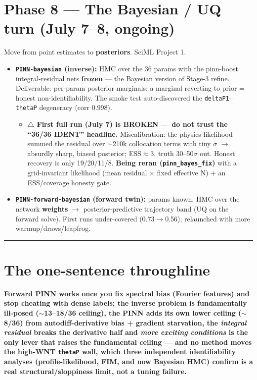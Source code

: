 \documentclass[11pt]{article}
\newcommand{\code}[1]{\texttt{\textcolor{codegray}{#1}}}
\begin{document}
\section*{Phase 8 --- The Bayesian / UQ turn (July 7--8, ongoing)}
Move from point estimates to \textbf{posteriors}. SciML Project 1.
\begin{itemize}
\item \textbf{\code{PINN-bayesian} (inverse):} HMC over the 36 params with the pinn-boost integral-residual nets \textbf{frozen} --- the Bayesian version of Stage-3 refine. Deliverable: per-param posterior marginals; a marginal reverting to prior = honest non-identifiability. The smoke test auto-discovered the \code{deltaP1}--\code{thetaP} degeneracy (corr 0.998).
\begin{itemize}
\item \textbf{$\triangle$ First full run (July 7) is BROKEN --- do not trust the ``36/36 IDENT'' headline.} Miscalibration: the physics likelihood summed the residual over $\sim$210k collocation terms with tiny $\sigma$ $\rightarrow$ absurdly sharp, biased posterior; ESS$\approx$3, truth 30--50$\sigma$ out. Honest recovery is only 19/20/11/8. \textbf{Being reran (\code{pinn\_bayes\_fix})} with a grid-invariant likelihood (mean residual $\times$ fixed effective N) + an ESS/coverage honesty gate.
\end{itemize}
\item \textbf{\code{PINN-forward-bayesian} (forward twin):} params known, HMC over the network \textbf{weights} $\rightarrow$ posterior-predictive trajectory band (UQ on the forward solve). First runs under-covered (0.73$\rightarrow$0.56); relaunched with more warmup/draws/leapfrog.
\end{itemize}

\rule{\linewidth}{0.4pt}

\section*{The one-sentence throughline}
\textbf{Forward PINN works once you fix spectral bias (Fourier features) and stop cheating with dense labels; the inverse problem is fundamentally ill-posed ($\sim$13--18/36 ceiling), the PINN adds its own lower ceiling ($\sim$8/36) from autodiff-derivative bias + gradient starvation, the \textit{integral residual} breaks the derivative half and \textit{more exciting conditions} is the only lever that raises the fundamental ceiling --- and no method moves the high-WNT \code{thetaP} wall, which three independent identifiability analyses (profile-likelihood, FIM, and now Bayesian HMC) confirm is a real structural/sloppiness limit, not a tuning failure.}
\end{document}

